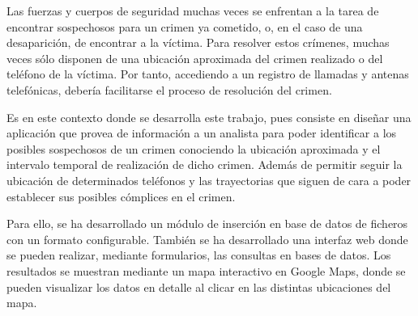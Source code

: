 Las fuerzas y cuerpos de seguridad muchas veces se enfrentan a la tarea de encontrar sospechosos para un crimen ya cometido, o, en el caso de una desaparición, de encontrar a la víctima. 
Para resolver estos crímenes, muchas veces sólo disponen de una ubicación aproximada del crimen realizado o del teléfono de la víctima. 
Por tanto, accediendo a un registro de llamadas y antenas telefónicas, debería facilitarse el proceso de resolución del crimen.

Es en este contexto donde se desarrolla este trabajo, pues consiste en diseñar una aplicación que provea de información a un analista para poder identificar a los posibles sospechosos de un crimen conociendo la ubicación aproximada y el intervalo temporal de realización de dicho crimen. 
Además de permitir seguir la ubicación de determinados teléfonos y las trayectorias que siguen de cara a poder establecer sus posibles cómplices en el crimen. 

Para ello, se ha desarrollado un módulo de inserción en base de datos de ficheros con un formato configurable. 
También se ha desarrollado una interfaz web donde se pueden realizar, mediante formularios, las consultas en bases de datos. 
Los resultados se muestran mediante un mapa interactivo en Google Maps, donde se pueden visualizar los datos en detalle al clicar en las distintas ubicaciones del mapa.



